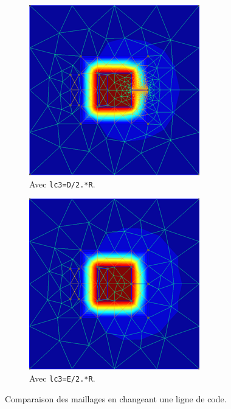 \documentclass[11pt]{article}
\begin{document}
\begin{figure}[H]
	\centering
	\begin{subfigure}{0.25\textwidth}
		\centering
		\includegraphics[width=\linewidth]{mesh1.png}
		\caption{Avec \texttt{lc3=D/2.*R}.}
		\label{fig:mesh1}
	\end{subfigure}\hspace{3cm}
	\begin{subfigure}{0.25\textwidth}
		\centering
		\includegraphics[width=\linewidth]{mesh2.png}
		\caption{Avec \texttt{lc3=E/2.*R}.}
		\label{fig:mesh2}
	\end{subfigure}
	\caption{Comparaison des maillages en changeant une ligne de code.}
	\label{fig:mesh}
\end{figure}
\end{document}
